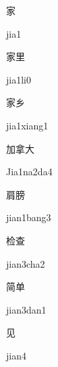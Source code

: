 \begin{verbete}[jia1]{家}
\begin{pronuncia}{jia1}
\end{pronuncia}
\end{verbete}

\begin{verbete}[jia1li0]{家里}
\begin{pronuncia}{jia1li0}
\end{pronuncia}
\end{verbete}

\begin{verbete}{家乡}
\begin{pronuncia}{jia1xiang1}
\end{pronuncia}
\end{verbete}

\begin{verbete}[Jia1na2da4]{加拿大}
\begin{pronuncia}{Jia1na2da4}
\end{pronuncia}
\end{verbete}

\begin{verbete}{肩膀}
\begin{pronuncia}{jian1bang3}
\end{pronuncia}
\end{verbete}

\begin{verbete}{检查}
\begin{pronuncia}{jian3cha2}
\end{pronuncia}
\end{verbete}

\begin{verbete}{简单}
\begin{pronuncia}{jian3dan1}
\end{pronuncia}
\end{verbete}

\begin{verbete}[jian4]{见}
\begin{pronuncia}{jian4}
\end{pronuncia}
\end{verbete}

